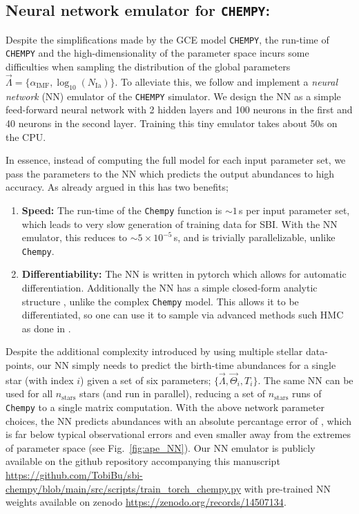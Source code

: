 \documentclass{aa}
\begin{document}
\subsection{Neural network emulator for \texttt{CHEMPY}:}
Despite the simplifications made by the GCE model \texttt{CHEMPY}, the run-time of \texttt{CHEMPY} and the high-dimensionality of the parameter space incurs some difficulties when sampling the distribution of the global parameters $\vec\Lambda = \{\alpha_\mathrm{IMF},\log_{10}(N_\mathrm{Ia})\}$. 
To alleviate this, we follow \cite{Philcox_2019} and implement a \textit{neural network} (NN) emulator of the \texttt{CHEMPY} simulator. We design the NN as a simple feed-forward neural network with 2 hidden layers and 100 neurons in the first and 40 neurons in the second layer. Training this tiny emulator takes about 50s on the CPU.

In essence, instead of computing the full model for each input parameter set, we pass the parameters to the NN which predicts the output abundances to high accuracy. As already argued in \cite{Philcox_2019} this has two benefits;
\begin{enumerate}
    \item \textbf{Speed:} The run-time of the \texttt{Chempy} function is $\sim1$\,s per input parameter set, which leads to very slow generation of training data for SBI. With the NN emulator, this reduces to $\sim5\times10^{-5}$\,s, and is trivially parallelizable, unlike \texttt{Chempy}.
    \item \textbf{Differentiability:} The NN is written in pytorch which allows for automatic differentiation. Additionally the NN has a simple closed-form analytic structure \citep[described in the appendix of][]{Philcox_2019}, unlike the complex \texttt{Chempy} model. This allows it to be differentiated, so one can use it to sample via advanced methods such HMC as done in \citep{Philcox_2019}.
\end{enumerate}

Despite the additional complexity introduced by using multiple stellar data-points, our NN simply needs to predict the birth-time abundances for a single star (with index $i$) given a set of six parameters; $\{\vec\Lambda,\vec\Theta_i,T_i\}$. The same NN can be used for all $n_\mathrm{stars}$ stars (and run in parallel), reducing a set of $n_\mathrm{stars}$ runs of \texttt{Chempy} to a single matrix computation. With the above network parameter choices, the NN predicts abundances with an absolute percantage error of , which is far below typical observational errors and even smaller away from the extremes of parameter space (see Fig.~\ref{fig:ape_NN}).
Our NN emulator is publicly available on the github repository accompanying this manuscript \href{https://github.com/TobiBu/sbi-chempy/blob/main/src/scripts/train_torch_chempy.py}{https://github.com/TobiBu/sbi-chempy/blob/main/src/scripts/train\_torch\_chempy.py} with pre-trained NN weights available on zenodo \href{https://zenodo.org/records/14507134}{https://zenodo.org/records/14507134}.
\end{document}
